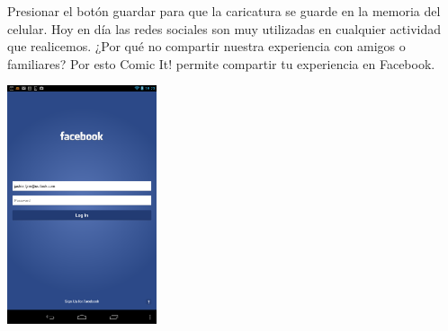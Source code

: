 \documentclass[12pt]{report}
\begin{document}
Presionar el botón guardar para que la caricatura se guarde en la memoria del celular.
Hoy en día las redes sociales son muy utilizadas en cualquier actividad que realicemos. ¿Por qué no compartir nuestra experiencia con amigos o familiares?
Por esto Comic It! permite compartir tu experiencia en Facebook.

	\begin{center}
		\begingroup
			\includegraphics[width=0.33\textwidth]{imagenes_usuario/face.png}
		\endgroup
	\end{center}
\end{document}
